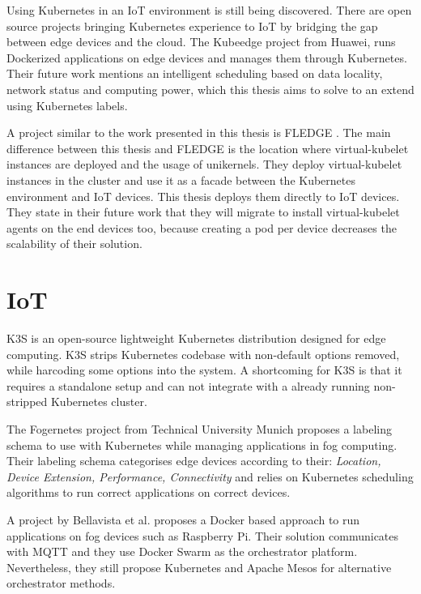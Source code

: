 Using Kubernetes in an IoT environment is still being discovered. There are open source projects bringing Kubernetes experience to IoT by bridging the gap between edge devices and the cloud. The Kubeedge project \cite{kubeedge} from Huawei, runs Dockerized applications on edge devices and manages them through Kubernetes. Their future work mentions an intelligent scheduling based on data locality, network status and computing power, which this thesis aims to solve to an extend using Kubernetes labels.

A project similar to the work presented in this thesis is FLEDGE \cite{fledge}. The main difference between this thesis and FLEDGE is the location where virtual-kubelet instances are deployed and the usage of unikernels. They deploy virtual-kubelet instances in the cluster and use it as a facade between the Kubernetes environment and IoT devices. This thesis deploys them directly to IoT devices. They state in their future work that they will migrate to install virtual-kubelet agents on the end devices too, because creating a pod per device decreases the scalability of their solution.


\section*{IoT}

 K3S \cite{k3s} is an open-source lightweight Kubernetes distribution designed for edge computing. K3S strips Kubernetes codebase with non-default options removed, while harcoding some options into the system. A shortcoming for K3S is that it requires a standalone setup and can not integrate with a already running non-stripped Kubernetes cluster.


The Fogernetes project \cite{fogernetes} from Technical University Munich proposes a labeling schema to use with Kubernetes while managing applications in fog computing. Their labeling schema categorises edge devices according to their: \textit{Location, Device Extension, Performance, Connectivity} and relies on Kubernetes scheduling algorithms to run correct applications on correct devices.

A project by Bellavista et al. \cite{Bellavista2017} proposes a Docker based approach to run applications on fog devices such as Raspberry Pi. Their solution communicates with MQTT and they use Docker Swarm as the orchestrator platform. Nevertheless, they still propose Kubernetes and Apache Mesos for alternative orchestrator methods.

